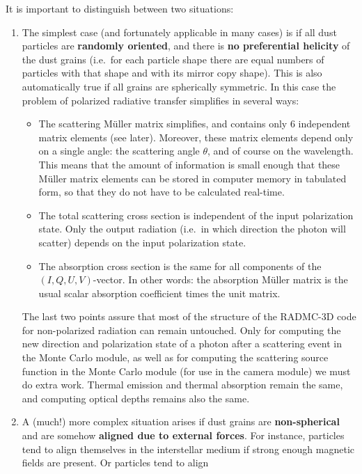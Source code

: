 \documentclass{report}
\begin{document}
It is important to distinguish between two situations:
\begin{enumerate}
\item The simplest case (and fortunately applicable in many cases) is if all
  dust particles are {\bf randomly oriented}, and there is {\bf no
    preferential helicity} of the dust grains (i.e.\ for each particle shape
  there are equal numbers of particles with that shape and with its mirror
  copy shape). This is also automatically true if all grains are spherically
  symmetric. In this case the problem of polarized radiative transfer
  simplifies in several ways:
  \begin{itemize}
  \item The scattering M\"uller matrix simplifies, and contains only 6
    independent matrix elements (see later). Moreover, these matrix elements
    depend only on a single angle: the scattering angle $\theta$, and of
    course on the wavelength. This means that the amount of information is
    small enough that these M\"uller matrix elements can be stored in
    computer memory in tabulated form, so that they do not have to be
    calculated real-time.
  \item The total scattering cross section is independent of the input
    polarization state. Only the output radiation (i.e.\ in which
    direction the photon will scatter) depends on the input polarization
    state. 
  \item The absorption cross section is the same for all components of
    the $(I,Q,U,V)$-vector. In other words: the absorption M\"uller
    matrix is the usual scalar absorption coefficient times the unit
    matrix. 
  \end{itemize}
  The last two points assure that most of the structure of the RADMC-3D code
  for non-polarized radiation can remain untouched. Only for computing the
  new direction and polarization state of a photon after a scattering event
  in the Monte Carlo module, as well as for computing the scattering source
  function in the Monte Carlo module (for use in the camera module) we must
  do extra work. Thermal emission and thermal absorption remain the same,
  and computing optical depths remains also the same.
\item A (much!) more complex situation arises if dust grains are {\bf
    non-spherical} and are somehow {\bf aligned due to external forces}. For
  instance, particles tend to align themselves in the interstellar medium if
  strong enough magnetic fields are present. Or particles tend to align

\end{enumerate}
\end{document}
